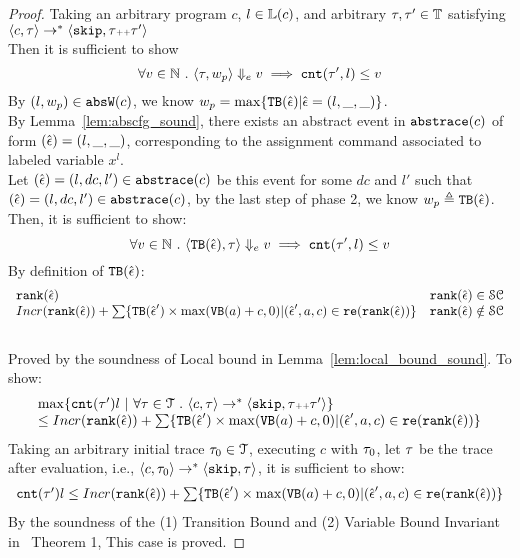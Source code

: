 \begin{proof}
  Taking an arbitrary program ${c}$, $l \in \mathbb{L}(c)$,
  and arbitrary $\mathtt{\tau}, \mathtt{\tau}' \in \mathbb{T}$ satisfying
  \\
  $\langle {c}, \mathtt{\tau} \rangle 
  \to^{*} \langle \mathtt{skip}, \mathtt{\tau}{\scriptscriptstyle ++}\mathtt{\tau}' \rangle 
  $
  \\
  Then it is sufficient to show 
  \[
    \forall v \in \mathbb{N}
    ~.~ \langle \mathtt{\tau}, w_p \rangle \Downarrow_e v \implies
    \mathtt{cnt}(\mathtt{\tau}', l) \leq v
    \]
  By $(l, w_p) \in \mathtt{abs}{\mathtt{W}}(c)$, we know 
  $  w_p = \max \{ {\mathtt{TB}}(\hat{\mathtt{\epsilon}{}}) | \hat{\mathtt{\epsilon}{}} = (l, \_, \_)\}$.
  \\
  By Lemma~\ref{lem:abscfg_sound}, there exists an abstract event in $\mathtt{abs}{\mathtt{trace}}(c)$ of form $(\hat{\mathtt{\epsilon}{}}) = (l, \_, \_)$,
  corresponding to the assignment command associated to labeled variable $x^l$. 
  \\
  Let $(\hat{\mathtt{\epsilon}{}}) = (l, dc, l') \in \mathtt{abs}{\mathtt{trace}}(c)$ be this event for some $dc$ and $l'$ such that  $(\hat{\mathtt{\epsilon}{}}) = (l, dc, l') \in \mathtt{abs}{\mathtt{trace}}(c)$,
  by the last step of phase 2, we know
  $
  w_p  \triangleq {\ensuremath{\mathtt{TB}}}(\hat{\mathtt{\epsilon}{}})
  $.
   Then, it is sufficient to show:
  \[
  \forall v \in \mathbb{N} ~.~ 
  \langle {\ensuremath{\mathtt{TB}}}(\hat{\mathtt{\epsilon}{}}), \mathtt{\tau} \rangle \Downarrow_e v \implies
  \mathtt{cnt}(\mathtt{\tau}', l) \leq v
  \]
  By definition of ${\mathtt{TB}}(\hat{\mathtt{\epsilon}{}})$:
  \[
 \begin{array}{ll}
  \mathtt{rank}(\hat{\mathtt{\epsilon}{}}) & \mathtt{rank}(\hat{\mathtt{\epsilon}{}}) \in \mathcal{SC} \\
  Incr(\mathtt{rank}(\hat{\mathtt{\epsilon}{}})) + 
  \sum\{{\mathtt{TB}}(\hat{\mathtt{\epsilon}{}}') \times \max({\mathtt{VB}}(a) + c, 0) | (\hat{\mathtt{\epsilon}{}}', a, c) \in \mathtt{re}(\mathtt{rank}(\hat{\mathtt{\epsilon}{}}))\} 
  & \mathtt{rank}(\hat{\mathtt{\epsilon}{}}) \notin \mathcal{SC}
\end{array}
\]
  \caseL{$\locbound(\absevent) \in \constdom$}
  \\
  Proved by the soundness of Local bound in Lemma~\ref{lem:local_bound_sound}.
  \caseL{$\locbound(\absevent) \notin \constdom$}
To show:
\[
  \begin{array}{l}
    \max \left\{ \counter(\vtrace') l ~ \middle\vert~
\forall \vtrace \in \mathcal{T} \st \config{{c}, \trace} \to^{*} \config{\eskip, \trace\tracecat\vtrace'} \right\} 
\\
\leq 
Incr(\locbound(\absevent)) + 
\sum\{\absclr(\absevent') \times \max(\varinvar(a) + c, 0) | (\absevent', a, c) \in \reset(\locbound(\absevent))\} 
\end{array}
\]
  Taking an arbitrary initial trace
  $\mathtt{\tau}_0 \in \mathcal{T}$, 
  executing $c$ with $\mathtt{\tau}_0$, let $\mathtt{\tau}$ be the trace after evaluation, i.e., $\langle {c}, \mathtt{\tau}_0 \rangle \to^{*} \langle \mathtt{skip},\mathtt{\tau} \rangle$, it is sufficient to show:
  \[ 
    \begin{array}{l}
      \mathtt{cnt}(\mathtt{\tau}') l \leq 
    Incr(\mathtt{rank}(\hat{\mathtt{\epsilon}{}})) + 
    \sum\{{\mathtt{TB}}(\hat{\mathtt{\epsilon}{}}') \times \max({\mathtt{VB}}(a) + c, 0) | (\hat{\mathtt{\epsilon}{}}', a, c) \in \mathtt{re}(\mathtt{rank}(\hat{\mathtt{\epsilon}{}}))\}
  \end{array}
  \]
%
 By the soundness of the (1) Transition Bound and (2) Variable Bound Invariant 
 in~\cite{sinn2017complexity} Theorem 1, 
This case is proved.
\end{proof}


%